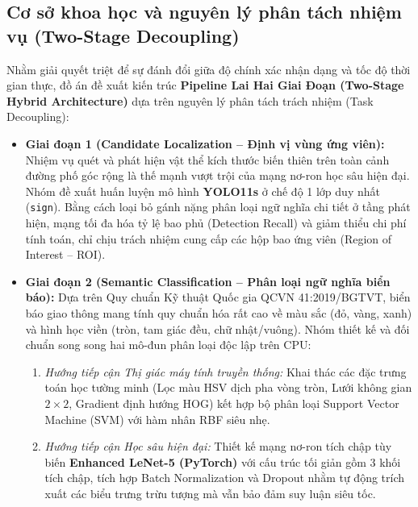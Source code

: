 \subsection{Cơ sở khoa học và nguyên lý phân tách nhiệm vụ (Two-Stage Decoupling)}
\label{subsec:co_so_khoa_hoc}

Nhằm giải quyết triệt để sự đánh đổi giữa độ chính xác nhận dạng và tốc độ thời gian thực, đồ án đề xuất kiến trúc \textbf{Pipeline Lai Hai Giai Đoạn (Two-Stage Hybrid Architecture)} dựa trên nguyên lý phân tách trách nhiệm (Task Decoupling):

\begin{itemize}
    \item \textbf{Giai đoạn 1 (Candidate Localization -- Định vị vùng ứng viên):} Nhiệm vụ quét và phát hiện vật thể kích thước biến thiên trên toàn cảnh đường phố góc rộng là thế mạnh vượt trội của mạng nơ-ron học sâu hiện đại. Nhóm đề xuất huấn luyện mô hình \textbf{YOLO11s} ở chế độ 1 lớp duy nhất (\texttt{sign}). Bằng cách loại bỏ gánh nặng phân loại ngữ nghĩa chi tiết ở tầng phát hiện, mạng tối đa hóa tỷ lệ bao phủ (Detection Recall) và giảm thiểu chi phí tính toán, chỉ chịu trách nhiệm cung cấp các hộp bao ứng viên (Region of Interest -- ROI).
    \item \textbf{Giai đoạn 2 (Semantic Classification -- Phân loại ngữ nghĩa biển báo):} Dựa trên Quy chuẩn Kỹ thuật Quốc gia QCVN 41:2019/BGTVT, biển báo giao thông mang tính quy chuẩn hóa rất cao về màu sắc (đỏ, vàng, xanh) và hình học viền (tròn, tam giác đều, chữ nhật/vuông). Nhóm thiết kế và đối chuẩn song song hai mô-đun phân loại độc lập trên CPU:
    \begin{enumerate}
        \item \textit{Hướng tiếp cận Thị giác máy tính truyền thống:} Khai thác các đặc trưng toán học tường minh (Lọc màu HSV dịch pha vòng tròn, Lưới không gian $2 \times 2$, Gradient định hướng HOG) kết hợp bộ phân loại Support Vector Machine (SVM) với hàm nhân RBF siêu nhẹ.
        \item \textit{Hướng tiếp cận Học sâu hiện đại:} Thiết kế mạng nơ-ron tích chập tùy biến \textbf{Enhanced LeNet-5 (PyTorch)} với cấu trúc tối giản gồm 3 khối tích chập, tích hợp Batch Normalization và Dropout nhằm tự động trích xuất các biểu trưng trừu tượng mà vẫn bảo đảm suy luận siêu tốc.
    \end{enumerate}
\end{itemize}

